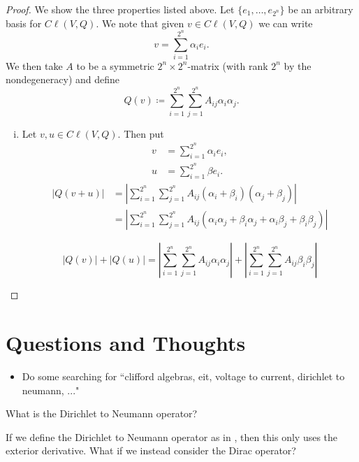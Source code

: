 \begin{proof}
We show the three properties listed above.  Let $\{e_1,\dots,e_{2^n}\}$ be an arbitrary basis for $C\ell(V,Q)$. We note that given $v \in C\ell(V,Q)$ we can write
\[
v=\sum_{i=1}^{2^n} \alpha_i e_i.
\]
We then take $A$ to be a symmetric $2^n\times 2^n$-matrix (with rank $2^n$ by the nondegeneracy) and define
\[
Q(v)\coloneqq \sum_{i=1}^{2^n} \sum_{j=1}^{2^n} A_{ij}\alpha_i \alpha_j.
\]
\begin{enumerate}[(i)]
    \item Let $v,u \in C\ell(V,Q)$.  Then put
    \begin{align*}
        v &= \sum_{i=1}^{2^n} \alpha_i e_i,\\
        u &= \sum_{i=1}^{2^n} \beta e_i.
    \end{align*}
    \begin{align*}
    |Q(v+u)|&=\left|\sum_{i=1}^{2^n} \sum_{j=1}^{2^n} A_{ij}(\alpha_i+\beta_i) (\alpha_j+\beta_j)\right|\\
    &= \left|\sum_{i=1}^{2^n} \sum_{j=1}^{2^n} A_{ij}(\alpha_i \alpha_j +\beta_i \alpha_j+ \alpha_i\beta_j +\beta_i\beta_j)\right|
    \end{align*}
    
    \[
    |Q(v)|+|Q(u)| = \left|\sum_{i=1}^{2^n} \sum_{j=1}^{2^n} A_{ij}\alpha_i \alpha_j\right| + \left|\sum_{i=1}^{2^n} \sum_{j=1}^{2^n} A_{ij}\beta_i \beta_j\right|
    \]
\end{enumerate}
\end{proof}



\section*{Questions and Thoughts}

\begin{itemize}
    \item Do some searching for ``clifford algebras, eit, voltage to current, dirichlet to neumann, ..."
\end{itemize}

\begin{question}
What is the Dirichlet to Neumann operator?
\end{question}

\begin{question}
If we define the Dirichlet to Neumann operator as in \cite{clay_d-to-n_map}, then this only uses the exterior derivative. What if we instead consider the Dirac operator?
\end{question}

